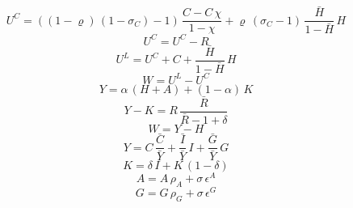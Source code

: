 \begin{dmath}
{U^{C}}=\left(\left(1-{{\varrho}}\right)\, \left(1-{{\sigma_{C}}}\right)-1\right)\, \frac{{C}-{C}\, {{\chi}}}{1-{{\chi}}}+{{\varrho}}\, \left({{\sigma_{C}}}-1\right)\, \frac{{\bar{H}}}{1-{\bar{H}}}\, {H}
\end{dmath}
\begin{dmath}
{U^{C}}={U^{C}}-{R}
\end{dmath}
\begin{dmath}
{U^{L}}={U^{C}}+{C}+\frac{{\bar{H}}}{1-{\bar{H}}}\, {H}
\end{dmath}
\begin{dmath}
{W}={U^{L}}-{U^{C}}
\end{dmath}
\begin{dmath}
{Y}={{\alpha}}\, \left({H}+{A}\right)+\left(1-{{\alpha}}\right)\, {K}
\end{dmath}
\begin{dmath}
{Y}-{K}={R}\, \frac{{\bar{R}}}{{\bar{R}}-1+{{\delta}}}
\end{dmath}
\begin{dmath}
{W}={Y}-{H}
\end{dmath}
\begin{dmath}
{Y}={C}\, {\frac{\bar{C}}{\bar{Y}}}+{\frac{\bar{I}}{\bar{Y}}}\, {I}+{\frac{\bar{G}}{\bar{Y}}}\, {G}
\end{dmath}
\begin{dmath}
{K}={{\delta}}\, {I}+{K}\, \left(1-{{\delta}}\right)
\end{dmath}
\begin{dmath}
{A}={A}\, {{\rho_{A}}}+{{\sigma}}\, {{\epsilon^{A}}}
\end{dmath}
\begin{dmath}
{G}={G}\, {{\rho_{G}}}+{{\sigma}}\, {{\epsilon^{G}}}
\end{dmath}
